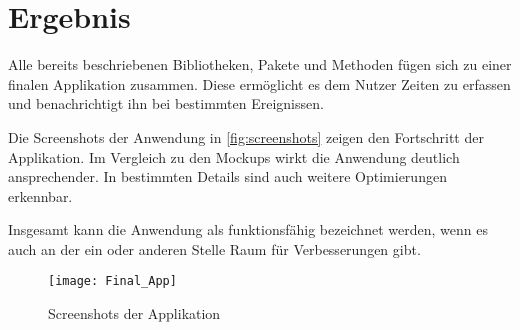 \section{Ergebnis}
Alle bereits beschriebenen Bibliotheken, Pakete und Methoden fügen sich zu einer finalen Applikation zusammen.
Diese ermöglicht es dem Nutzer Zeiten zu erfassen und benachrichtigt ihn bei bestimmten Ereignissen.

Die Screenshots der Anwendung in \autoref{fig:screenshots} zeigen den Fortschritt der Applikation.
Im Vergleich zu den Mockups wirkt die Anwendung deutlich ansprechender.
In bestimmten Details sind auch weitere Optimierungen erkennbar.

Insgesamt kann die Anwendung als funktionsfähig bezeichnet werden,
wenn es auch an der ein oder anderen Stelle Raum für Verbesserungen gibt.

\begin{figure}[h]
    \centering
    \texttt{[image: Final\_App]}
    \caption{Screenshots der Applikation}
    \label{fig:screenshots}
\end{figure}